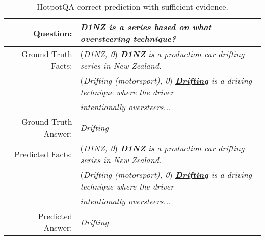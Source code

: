 \documentclass[11pt,a4paper]{article}
\begin{document}
\begin{table*}[t]
\centering
\small
\begin{tabular}{rl}
\toprule
Question: & \textit{D1NZ is a series based on what oversteering technique?}\\
\midrule

Ground Truth Facts: & (\textit{D1NZ, 0}) \textit{\underline{\textbf{D1NZ}} is a production car drifting series in New Zealand.}\\
 & (\textit{Drifting (motorsport), 0}) \textit{\underline{\textbf{Drifting}} is a driving technique where the driver}\\ &   \textit{intentionally oversteers...}\\
Ground Truth Answer: & \textit{Drifting}\\
\midrule
Predicted Facts: & (\textit{D1NZ, 0}) \textit{\underline{\textbf{D1NZ}} is a production car drifting series in New Zealand.}\\
 & (\textit{Drifting (motorsport), 0}) \textit{\underline{\textbf{Drifting}} is a driving technique where the driver}\\ &   \textit{intentionally oversteers...}\\
Predicted Answer: & \textit{Drifting}\\
\bottomrule
\end{tabular}
\caption{HotpotQA correct prediction with sufficient evidence.}
\label{tab:hotpot_example_1}
\end{table*}
\end{document}
